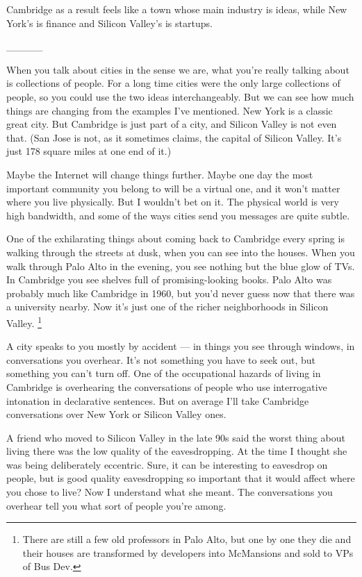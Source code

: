 Cambridge as a result feels like a town whose main industry is ideas,
while New York's is finance and Silicon Valley's is startups.

\_\_\_\_\_

When you talk about cities in the sense we are, what you're really
talking about is collections of people. For a long time cities were the
only large collections of people, so you could use the two ideas
interchangeably. But we can see how much things are changing from the
examples I've mentioned. New York is a classic great city. But Cambridge
is just part of a city, and Silicon Valley is not even that. (San Jose
is not, as it sometimes claims, the capital of Silicon Valley. It's just
178 square miles at one end of it.)

Maybe the Internet will change things further. Maybe one day the most
important community you belong to will be a virtual one, and it won't
matter where you live physically. But I wouldn't bet on it. The physical
world is very high bandwidth, and some of the ways cities send you
messages are quite subtle.

One of the exhilarating things about coming back to Cambridge every
spring is walking through the streets at dusk, when you can see into the
houses. When you walk through Palo Alto in the evening, you see nothing
but the blue glow of TVs. In Cambridge you see shelves full of
promising-looking books. Palo Alto was probably much like Cambridge in
1960, but you'd never guess now that there was a university nearby. Now
it's just one of the richer neighborhoods in Silicon Valley.
\footnote{There are still a few old professors in Palo Alto, but one by
one they die and their houses are transformed by developers into
McMansions and sold to VPs of Bus Dev.}

A city speaks to you mostly by accident --- in things you see through
windows, in conversations you overhear. It's not something you have to
seek out, but something you can't turn off. One of the occupational
hazards of living in Cambridge is overhearing the conversations of
people who use interrogative intonation in declarative sentences. But on
average I'll take Cambridge conversations over New York or Silicon
Valley ones.

A friend who moved to Silicon Valley in the late 90s said the worst
thing about living there was the low quality of the eavesdropping. At
the time I thought she was being deliberately eccentric. Sure, it can be
interesting to eavesdrop on people, but is good quality eavesdropping so
important that it would affect where you chose to live? Now I understand
what she meant. The conversations you overhear tell you what sort of
people you're among.


